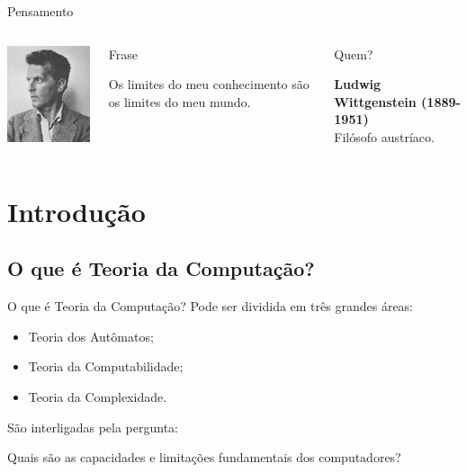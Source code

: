 \documentclass[xcolor=dvipsnames,table]{beamer}
\begin{document}
	\begin{frame}{Pensamento}
		\begin{columns}
		  		\begin{center}
		    		\includegraphics[height=.5\textheight]{images/wittgenstein.jpg}
		  		\end{center}
				\begin{block}{Frase}
					\begin{center}
						{\large Os limites do meu conhecimento são os limites do meu mundo.}
					\end{center}
				\end{block}		  		
		  		\begin{block}{Quem?}
		  			\begin{center}
						{\bf Ludwig Wittgenstein (1889-1951)} \\ Filósofo austríaco.
					\end{center}
				\end{block}
		\end{columns}
	\end{frame}
	\section{Introdução}
	\subsection{O que é Teoria da Computação?}
	\begin{frame}{O que é Teoria da Computação?}
		Pode ser dividida em três grandes áreas:
		\begin{itemize}
			\item Teoria dos Autômatos;
			\item Teoria da Computabilidade;
			\item Teoria da Complexidade.	
		\end{itemize}\pause
		São interligadas pela pergunta:
		\begin{block}{}
			Quais são as capacidades e limitações fundamentais dos computadores?
		\end{block}
	\end{frame}
	
\end{document}
